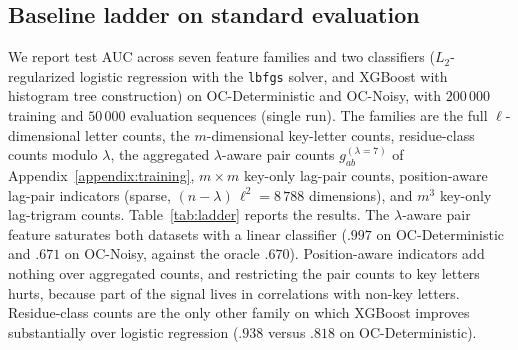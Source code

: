 \documentclass{article} %
\theoremstyle{plain}
\theoremstyle{definition}
\theoremstyle{remark}
\begin{document}
\subsection{Baseline ladder on standard evaluation}
\label{appendix:ladder}
We report test AUC across seven feature families and two classifiers ($L_2$-regularized logistic regression with the \texttt{lbfgs} solver, and XGBoost with histogram tree construction) on OC-Deterministic and OC-Noisy, with $200\,000$ training and $50\,000$ evaluation sequences (single run). The families are the full $\ell$-dimensional letter counts, the $m$-dimensional key-letter counts, residue-class counts modulo $\lambda$, the aggregated $\lambda$-aware pair counts $g_{ab}^{(\lambda=7)}$ of Appendix~\ref{appendix:training}, $m\times m$ key-only lag-pair counts, position-aware lag-pair indicators (sparse, $(n-\lambda)\,\ell^2 = 8\,788$ dimensions), and $m^3$ key-only lag-trigram counts. Table~\ref{tab:ladder} reports the results. The $\lambda$-aware pair feature saturates both datasets with a linear classifier ($.997$ on OC-Deterministic and $.671$ on OC-Noisy, against the oracle $.670$). Position-aware indicators add nothing over aggregated counts, and restricting the pair counts to key letters hurts, because part of the signal lives in correlations with non-key letters. Residue-class counts are the only other family on which XGBoost improves substantially over logistic regression ($.938$ versus $.818$ on OC-Deterministic).
\end{document}
